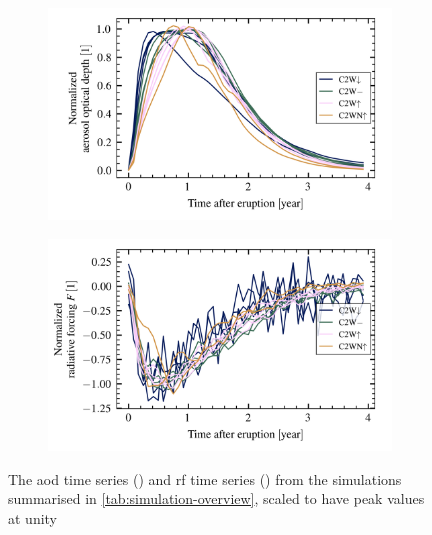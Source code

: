 \documentclass{ametsocV5}
\begin{document}
\begin{figure}
  \begin{subfigure}{\linewidth}
    \centering
    \includegraphics[width=0.95\linewidth]{figures/aod_arrays_normalized}
    \caption{}%
    \label{fig:aod_arrays_normalized}
  \end{subfigure}
  \begin{subfigure}{\linewidth}
    \centering
    \includegraphics[width=0.95\linewidth]{figures/toa_arrays_normalized}
    \caption{}%
    \label{fig:toa_arrays_normalized}
  \end{subfigure}

  \caption{The \ac{aod} time series () and \ac{rf} time
    series () from the simulations summarised in
    \cref{tab:simulation-overview}, scaled to have peak values at unity
  }\label{fig:arrays_normalized}
\end{figure}

%
\end{document}
